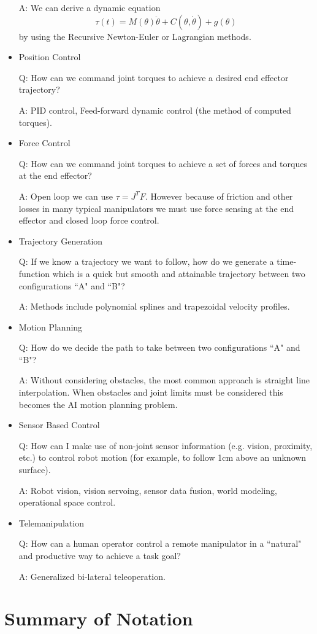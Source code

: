 \begin{itemize}
A:  We can derive a dynamic equation
\[
\tau(t) = M(\theta)\ddot{\theta} + C(\theta,\dot{\theta}) + g(\theta)
\]
by using the Recursive Newton-Euler or Lagrangian methods. 

	\item Position Control

Q: How can we command joint torques to achieve a desired end effector trajectory?

A: PID control, Feed-forward dynamic control (the method of computed torques).

	\item Force Control

Q: How can we command joint torques to achieve a set of forces and torques at the end effector?

A:  Open loop we can use $\tau = J^T F$. However because of friction and other losses in many typical manipulators we must use force sensing at the end effector and closed loop force control.


	\item Trajectory Generation

Q: If we know a trajectory we want to follow, how do we generate a time-function which is a quick but smooth and attainable trajectory between two configurations ``A" and ``B"?

A:  Methods include polynomial splines and trapezoidal velocity profiles.

	\item Motion Planning

Q:  How do we decide the path to take between two configurations ``A" and ``B"?

A:  Without considering obstacles, the most common approach is straight line interpolation.  When obstacles and joint limits must be considered this becomes the AI motion planning problem.

	\item Sensor Based Control

Q: How can I make use of non-joint sensor information (e.g. vision, proximity, etc.) to control robot motion (for example, to follow 1cm above an unknown surface).

A: Robot vision, vision servoing, sensor data fusion, world modeling, operational space control.

	\item Telemanipulation 

Q: How can a human operator control a remote manipulator in a ``natural" and productive way to achieve a task goal?

A: Generalized bi-lateral teleoperation.

\end{itemize}

\section{Summary of Notation}

